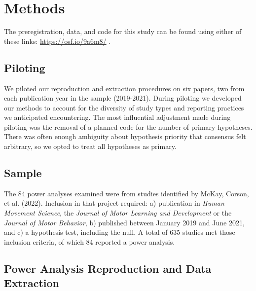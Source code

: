 \documentclass[
  man, donotrepeattitle,mask,floatsintext]{apa7}
\begin{document}
\hypertarget{methods}{%
\section{Methods}\label{methods}}

The preregistration, data, and code for this study can be found using either of these links: \url{https://osf.io/9a6m8/}  .

\hypertarget{piloting}{%
\subsection{Piloting}\label{piloting}}

We piloted our reproduction and extraction procedures on six papers, two from each publication year in the sample (2019-2021). During piloting we developed our methods to account for the diversity of study types and reporting practices we anticipated encountering. The most influential adjustment made during piloting was the removal of a planned code for the number of primary hypotheses. There was often enough ambiguity about hypothesis priority that consensus felt arbitrary, so we opted to treat all hypotheses as primary.

\hypertarget{sample}{%
\subsection{Sample}\label{sample}}

The 84 power analyses examined were from studies identified by McKay, Corson, et al. (2022). Inclusion in that project required: a) publication in \emph{Human Movement Science}, the \emph{Journal of Motor Learning and Development} or the \emph{Journal of Motor Behavior}, b) published between January 2019 and June 2021, and c) a hypothesis test, including the null. A total of 635 studies met those inclusion criteria, of which 84 reported a power analysis.

\hypertarget{power-analysis-reproduction-and-data-extraction}{%
\subsection{Power Analysis Reproduction and Data Extraction}\label{power-analysis-reproduction-and-data-extraction}}
\end{document}
